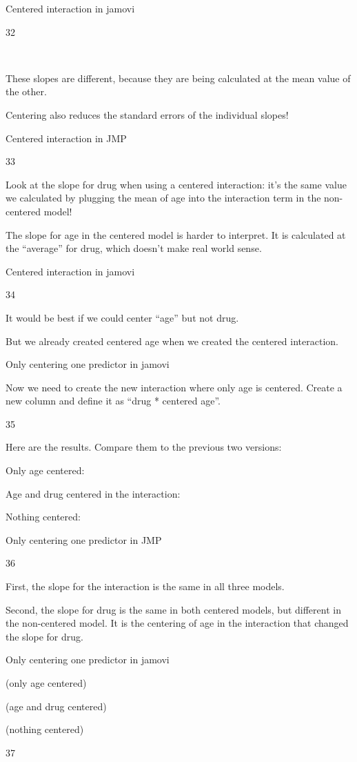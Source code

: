 \documentclass[
  letterpaper,
  DIV=11,
  numbers=noendperiod]{scrreprt}
\begin{document}
Centered interaction in jamovi

32

~

These slopes are different, because they are being calculated at the
mean value of the other. 

Centering also reduces the standard errors of the individual slopes!

Centered interaction in JMP

33

Look at the slope for drug when using a centered interaction: it's the
same value we calculated by plugging the mean of age into the
interaction term in the non-centered model!

The slope for age in the centered model is harder to interpret. It is
calculated at the ``average'' for drug, which doesn't make real world
sense.

Centered interaction in jamovi

34

It would be best if we could center ``age'' but not drug.

But we already created centered age when we created the centered
interaction.

Only centering one predictor in jamovi

Now we need to create the new interaction where only age is centered.
Create a new column and define it as ``drug * centered age''.

35

Here are the results. Compare them to the previous two versions:

Only age centered:

Age and drug centered inthe interaction:

Nothing centered:

Only centering one predictor in JMP

36

First, the slope for the interaction is the same in all three models.

Second, the slope for drug is the same in both centered models, but
different in the non-centered model. It is the centering of age in the
interaction that changed the slope for drug.

Only centering one predictor in jamovi

(only age centered)

(age and drug centered)

(nothing centered)

37
\end{document}
